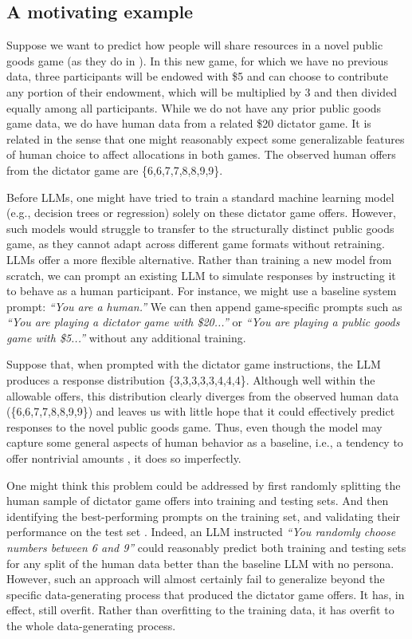 \documentclass[11pt]{article}
\theoremstyle{definition}
\newcommand{\persona}{prompt}
\begin{document}
\subsection{A motivating example}

Suppose we want to predict how people will share resources in a novel public goods game (as they do in \cite{alsobay2025integrative}).
In this new game, for which we have no previous data, three participants will be endowed with \$5 and can choose to contribute any portion of their endowment, which will be multiplied by 3 and then divided equally among all participants.
While we do not have any prior public goods game data, we do have human data from a related \$20 dictator game.
It is related in the sense that one might reasonably expect some generalizable features of human choice to affect allocations in both games.
The observed human offers from the dictator game are \{6,6,7,7,8,8,9,9\}.

Before LLMs, one might have tried to train a standard machine learning model (e.g., decision trees or regression) solely on these dictator game offers.
However, such models would struggle to transfer to the structurally distinct public goods game, as they cannot adapt across different game formats without retraining.
LLMs offer a more flexible alternative. 
Rather than training a new model from scratch, we can prompt 
an existing LLM to simulate responses by instructing it to behave as a human participant.
For instance, we might use a baseline system prompt: \emph{``You are a human.''}
We can then append game-specific prompts such as \emph{``You are playing a dictator game with \$20...''} or \emph{``You are playing a public goods game with \$5...''} without any additional training.

Suppose that, when prompted with the dictator game instructions, the LLM produces a response distribution \{3,3,3,3,3,4,4,4\}.
Although well within the allowable offers, this distribution clearly diverges from the observed human data  (\{6,6,7,7,8,8,9,9\}) and leaves us with little hope that it could effectively predict responses to the novel public goods game.
Thus, even though the model may capture some general aspects of human behavior as a baseline, i.e., a tendency to offer nontrivial amounts \citep{Henrich2001InSearch}, it does so imperfectly.

One might think this problem could be addressed by first randomly splitting the human sample of dictator game offers into training and testing sets.
And then identifying the best-performing \persona{s} on the training set, and validating their performance on the test set \citep{ML2017Sendhil,ludwig2025llmapplied}.
Indeed, an LLM instructed \emph{``You randomly choose numbers between 6 and 9''} could reasonably predict both training and testing sets for any split of the human data better than the baseline LLM with no persona.
However, such an approach will almost certainly fail to generalize beyond the specific data-generating process that produced the dictator game offers.
It has, in effect, still overfit.
Rather than overfitting to the training data, it has overfit to the whole data-generating process.
\end{document}
